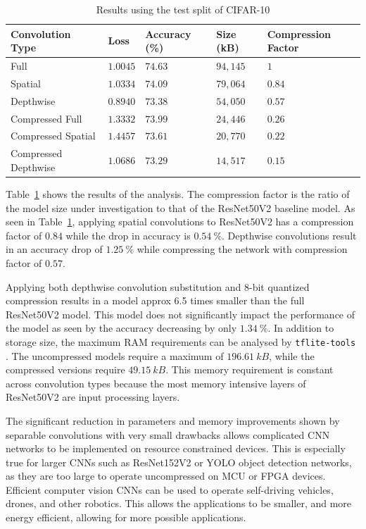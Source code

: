 \documentclass{article}
\begin{document}
	\begin{table}[b!]
		\caption{Results using the test split of CIFAR-10}
		\label{tbl:results}
		\centering
		\begin{tabular}{lllll}
			\toprule
			Convolution Type     & Loss     & Accuracy (\%)    & Size (kB) & Compression Factor \\ \midrule
			Full                 & $1.0045$ & $74.63$          & $94,145$  & $1$                \\
			Spatial              & $1.0334$ & $74.09$          & $79,064$  & $0.84$             \\
			Depthwise            & $0.8940$ & $73.38$          & $54,050$  & $0.57$             \\
			Compressed Full      & $1.3332$ & $73.99$          & $24,446$  & $0.26$             \\
			Compressed Spatial   & $1.4457$ & $73.61$          & $20,770$  & $0.22$             \\
			Compressed Depthwise & $1.0686$ & $\mathbf{73.29}$ & $14,517$  & $\mathbf{0.15}$    \\ \bottomrule
		\end{tabular}
	\end{table}

	Table~\ref{tbl:results} shows the results of the analysis. The compression factor is the ratio of the model size under investigation to that of the ResNet50V2 baseline model. As seen in Table~\ref{tbl:results}, applying spatial convolutions to ResNet50V2 has a compression factor of $0.84$ while the drop in accuracy is $0.54~\%$. Depthwise convolutions result in an accuracy drop of $1.25~\%$ while compressing the network with compression factor of $0.57$.
	
	Applying both depthwise convolution substitution and 8-bit quantized compression results in a model approx 6.5 times smaller than the full ResNet50V2 model. This model does not significantly impact the performance of the model as seen by the accuracy decreasing by only $1.34~\%$. In addition to storage size, the maximum RAM requirements can be analysed by \verb|tflite-tools| \cite{tflietools}. The uncompressed models require a maximum of $196.61~kB$, while the compressed versions require $49.15~kB$. This memory requirement is constant across convolution types because the most memory intensive layers of ResNet50V2 are input processing layers.
	
	The significant reduction in parameters and memory improvements shown by separable convolutions with very small drawbacks allows complicated CNN networks to be implemented on resource constrained devices. This is especially true for larger CNNs such as ResNet152V2 or YOLO object detection networks, as they are too large to operate uncompressed on MCU or FPGA devices. Efficient computer vision CNNs can be used to operate self-driving vehicles, drones, and other robotics. This allows the applications to be smaller, and more energy efficient, allowing for more possible applications. 
	
\end{document}
